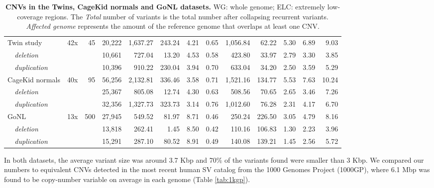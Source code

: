 \begin{table}
{\begin{tabular}{|l|r|r|rrr|r|rr|rrrr|}
      Twin study            & 42x & 45  & 20,222 & 1,637.27 & 243.24 & 4.21 & 0.65 & 1,056.84 & 62.22  & 5.30 & 6.89 & 9.03  \\
      {\it ~~deletion}      &     &     & 10,661 & 727.04  & 13.20  & 4.53 & 0.58 & 423.80  & 33.97  & 2.79 & 3.30 & 3.85  \\
      {\it ~~duplication}   &     &     & 10,396 & 910.22  & 230.04 & 3.94 & 0.70 & 633.04  & 34.20  & 2.50 & 3.59 & 5.29  \\
      \hline                                                                                                                                                                  
      CageKid normals & 40x & 95  & 56,256 & 2,132.81 & 336.46 & 3.58 & 0.71 & 1,521.16 & 134.77 & 5.53 & 7.63 & 10.24 \\
      {\it ~~deletion}      &     &     & 25,367 & 805.08  & 12.74  & 4.30 & 0.63 & 508.56  & 70.65  & 2.65 & 3.46 & 7.26  \\
      {\it ~~duplication}   &     &     & 32,356 & 1,327.73 & 323.73 & 3.14 & 0.76 & 1,012.60 & 76.28  & 2.31 & 4.17 & 6.70  \\
      \hline                                                                                                                                                                  
      GoNL                  & 13x & 500 & 27,945 & 549.52  & 81.97  & 8.71 & 0.46 & 250.24  & 226.50 & 3.05 & 4.79 & 8.16  \\
      {\it ~~deletion}      &     &     & 13,818 & 262.41  & 1.45   & 8.50 & 0.42 & 110.16  & 106.83 & 1.30 & 2.23 & 3.96  \\
      {\it ~~duplication}   &     &     & 15,291 & 287.10  & 80.52  & 8.91 & 0.49 & 140.08  & 139.21 & 1.45 & 2.56 & 5.72  \\
      \hline
    \end{tabular}
  }
  \caption[CNVs in the Twins, CageKid normals and GoNL datasets.]{{\bf CNVs in the Twins, CageKid normals and GoNL datasets. }{\small WG: whole genome; ELC: extremely low-coverage regions. The {\it Total} number of variants is the total number after collapsing recurrent variants. {\it Affected genome} represents the amount of the reference genome that overlaps at least one CNV.}}
  \label{tab:res}
\end{table}
In both datasets, the average variant size was around 3.7 Kbp and 70\% of the variants found were smaller than 3 Kbp.
We compared our numbers to equivalent CNVs detected in the most recent human SV catalog from the 1000 Genomes Project (1000GP), where 6.1 Mbp was found to be copy-number variable on average in each genome (Table \ref{tab:1kgp}).
